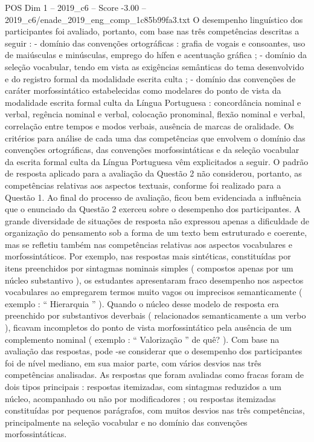 \begin{textsample}{POS Dim 1 – 2019\_c6 – Score -3.00 – 2019\_c6/enade\_2019\_eng\_comp\_1c85b99fa3.txt}
O desempenho linguístico dos participantes foi avaliado, portanto, com base nas três competências descritas a seguir : - domínio das convenções ortográficas : grafia de vogais e consoantes, uso de maiúsculas e minúsculas, emprego do hífen e acentuação gráfica ; - domínio da seleção vocabular, tendo em vista as exigências semânticas do tema desenvolvido e do registro formal da modalidade escrita culta ; - domínio das convenções de caráter morfossintático estabelecidas como modelares do ponto de vista da modalidade escrita formal culta da Língua Portuguesa : concordância nominal e verbal, regência nominal e verbal, colocação pronominal, flexão nominal e verbal, correlação entre tempos e modos verbais, ausência de marcas de oralidade.
Os critérios para análise de cada uma das competências que envolvem o domínio das convenções ortográficas, das convenções morfossintáticas e da seleção vocabular da escrita formal culta da Língua Portuguesa vêm explicitados a seguir.
O padrão de resposta aplicado para a avaliação da Questão 2 não considerou, portanto, as competências relativas aos aspectos textuais, conforme foi realizado para a Questão 1.
Ao final do processo de avaliação, ficou bem evidenciada a influência que o enunciado da Questão 2 exerceu sobre o desempenho dos participantes.
A grande diversidade de situações de resposta não expressou apenas a dificuldade de organização do pensamento sob a forma de um texto bem estruturado e coerente, mas se refletiu também nas competências relativas aos aspectos vocabulares e morfossintáticos.
Por exemplo, nas respostas mais sintéticas, constituídas por itens preenchidos por sintagmas nominais simples ( compostos apenas por um núcleo substantivo ), os estudantes apresentaram fraco desempenho nos aspectos vocabulares ao empregarem termos muito vagos ou imprecisos semanticamente ( exemplo : “ Hierarquia ” ).
Quando o núcleo desse modelo de resposta era preenchido por substantivos deverbais ( relacionados semanticamente a um verbo ), ficavam incompletos do ponto de vista morfossintático pela ausência de um complemento nominal ( exemplo : “ Valorização ” de quê? ).
Com base na avaliação das respostas, pode -se considerar que o desempenho dos participantes foi de nível mediano, em sua maior parte, com vários desvios nas três competências analisadas.
As respostas que foram avaliadas como fracas foram de dois tipos principais : respostas itemizadas, com sintagmas reduzidos a um núcleo, acompanhado ou não por modificadores ; ou respostas itemizadas constituídas por pequenos parágrafos, com muitos desvios nas três competências, principalmente na seleção vocabular e no domínio das convenções morfossintáticas.

\end{textsample}
